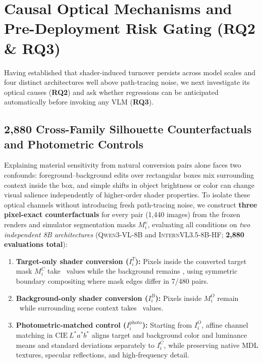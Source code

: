 \section{Causal Optical Mechanisms and Pre-Deployment Risk Gating (\textbf{RQ2} \& \textbf{RQ3})}
\label{sec:mechanisms}

Having established that shader-induced turnover persists across model scales and four distinct architectures well above path-tracing noise, we next investigate its optical causes (\textbf{RQ2}) and ask whether regressions can be anticipated automatically before invoking any VLM (\textbf{RQ3}).

\subsection{2,880 Cross-Family Silhouette Counterfactuals and Photometric Controls}
\label{sec:counterfactuals}

Explaining material sensitivity from natural conversion pairs alone faces two confounds: foreground--background edits over rectangular boxes mix surrounding context inside the box, and simple shifts in object brightness or color can change visual salience \citep{Burgert2025NotTexture} independently of higher-order shader properties. To isolate these optical channels without introducing fresh path-tracing noise, we construct \textbf{three pixel-exact counterfactuals} for every pair (1,440 images) from the frozen renders and simulator segmentation masks $M_i^v$, evaluating all conditions on \emph{two independent 8B architectures} (\textsc{Qwen3-VL-8B} and \textsc{InternVL3.5-8B-HF}; \textbf{2,880 evaluations total}):
\begin{enumerate}
    \item \textbf{Target-only shader conversion ($I_i^T$):} Pixels inside the converted target mask $M_i^C$ take \converted\ values while the background remains \original, using symmetric boundary compositing where mask edges differ in 7/480 pairs.
    \item \textbf{Background-only shader conversion ($I_i^B$):} Pixels inside $M_i^O$ remain \original\ while surrounding scene context takes \converted\ values.
    \item \textbf{Photometric-matched control ($I_i^{\text{photo}}$):} Starting from $I_i^O$, affine channel matching in $\mathrm{CIE}~L^*a^*b^*$ aligns target and background color and luminance means and standard deviations separately to $I_i^C$, while preserving native \textsc{MDL} textures, specular reflections, and high-frequency detail.
\end{enumerate}

